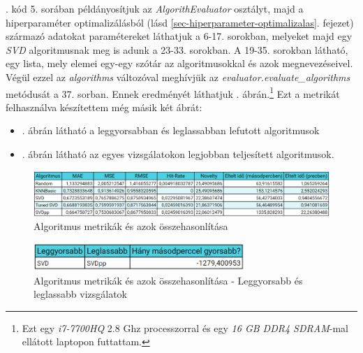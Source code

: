 \documentclass[
]{thesis-ekf}
\theoremstyle{definition}
\theoremstyle{remark}
\newcommand{\benchmarkSpecification} {Ezt egy \emph{i7-7700HQ} 2.8 Ghz processzorral és egy \emph{16 GB DDR4 SDRAM}-mal ellátott laptopon futtattam.}
\begin{document}


. kód 5. sorában példányosítjuk az \emph{AlgorithEvaluator} osztályt, majd a hiperparaméter optimalizálásból  (lásd \ref{sec-hiperparameter-optimalizalas}. fejezet) származó adatokat paramétereket láthatjuk a 6-17. sorokban, melyeket majd egy \emph{SVD} algoritmusnak meg is adunk a 23-33. sorokban. A 19-35. sorokban látható, egy lista, mely elemei egy-egy szótár az algoritmusokkal és azok megnevezéseivel. Végül ezzel az \emph{algorithms} változóval meghívjük az \emph{evaluator.evaluate\_algorithms} metódusát a 37. sorban. Ennek eredményét láthatjuk . ábrán.\footnote{\benchmarkSpecification} Ezt a metrikát felhasználva készítettem még másik két ábrát:
\begin{itemize}
	\item {}. ábrán látható  a leggyorsabban és leglassabban lefutott algoritmusok
	\item {}. ábrán látható  az egyes vizsgálatokon legjobban teljesített algoritmusok.
\end{itemize}


\begin{figure}[H]
	\centering
	\includegraphics[width=14cm]{images/algoritmus-metrikak.png}
	\caption[Algoritmus metrikák és azok összehasonlítása]{Algoritmus metrikák és azok összehasonlítása}
	\label{fig-algoruitmus-metrikak}
\end{figure}

\begin{figure}[H]
	\centering
	\includegraphics[width=8cm]{images/algoritmus-metrikak-leggyorsabb-vs-leglassabb.PNG}
	\caption[Algoritmus metrikák és azok összehasonlítása - Leggyorsabb és leglassabb vizsgálatok]{Algoritmus metrikák és azok összehasonlítása - Leggyorsabb és leglassabb vizsgálatok}
	\label{fig-algoruitmus-metrikak-leggyorsabb-leglassabb}
\end{figure}
\end{document}
